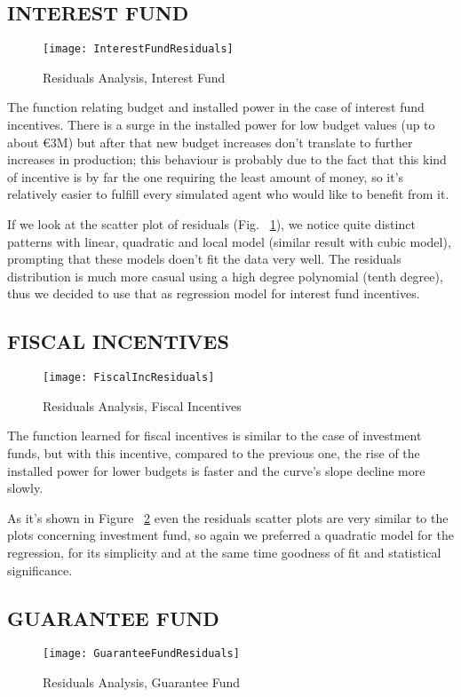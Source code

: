 \documentclass [twocolumn,a4paper,10pt]{ECMS}
\newcommand{\Subsection}[1]{\subsection*{#1}\vspace*{-0.7em}}
\begin{document}
\Subsection{INTEREST FUND}

\begin{figure}[hbt]
	\centering
	\texttt{[image: InterestFundResiduals]}
	\caption{Residuals Analysis, Interest Fund}
	\label{InterestFundResiduals}
\end{figure}

The function relating budget and installed power in the case of interest fund incentives. There is a surge in the installed power for low budget values (up to about \euro3M) but after that new budget increases don't translate to further increases in production; this behaviour is probably due to the fact that this kind of incentive is by far the one requiring the least amount of money, so it's relatively easier to fulfill every simulated agent who would like to benefit from it.

If we look at the scatter plot of residuals (Fig. ~\ref{InterestFundResiduals}), we notice quite distinct patterns with linear, quadratic and local model (similar result with cubic model), prompting that these models doen't fit the data very well. The residuals distribution is much more casual using a high degree polynomial (tenth degree), thus we decided to use that as regression model for interest fund incentives.

\Subsection{FISCAL INCENTIVES}

\begin{figure}[hbt]
	\centering
	\texttt{[image: FiscalIncResiduals]}
	\caption{Residuals Analysis, Fiscal Incentives}
	\label{FiscalIncResiduals}
\end{figure}

The function learned for fiscal incentives is similar to the case of investment funds, but with this incentive, compared to the previous one, the rise of the installed power for lower budgets is faster and the curve's slope decline more slowly. 

As it's shown in Figure ~\ref{FiscalIncResiduals} even the residuals scatter plots are very similar to the plots concerning investment fund, so again we preferred a quadratic model for the regression, for its simplicity and at the same time goodness of fit and statistical significance.

\Subsection{GUARANTEE FUND}

\begin{figure}[hbt]
	\centering
	\texttt{[image: GuaranteeFundResiduals]}
	\caption{Residuals Analysis, Guarantee Fund}
	\label{GuaranteeFundResiduals}
\end{figure}
\end{document}

